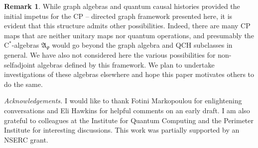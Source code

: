 \documentclass[12pt]{amsart}
\theoremstyle{plain}
\theoremstyle{definition}
\newtheorem{rem}[thm]{Remark}
\newcommand{\ca}{\mathrm{C}^*}
\newcommand{\fA}{{\mathfrak{A}}}
\begin{document}
\begin{rem}
While graph algebras and quantum causal histories provided the
initial impetus for the CP -- directed graph framework presented
here, it is evident that this structure admits other
possibilities. Indeed, there are many CP maps that are neither
unitary maps nor quantum operations, and presumably the
$\ca$-algebras $\fA_\Psi$ would go beyond the graph algebra and
QCH subclasses in general. We have also not considered here the
various possibilities for non-selfadjoint algebras defined by this
framework. We plan to undertake investigations of these algebras
elsewhere and hope this paper motivates others to do the same.
\end{rem}



















\vspace{0.05in}


{\noindent}{\it Acknowledgements.}
I would like to thank Fotini Markopoulou
for enlightening conversations and Eli Hawkins for helpful
comments on an early draft. I am also grateful to colleagues at
the Institute for Quantum Computing and the Perimeter Institute
for interesting discussions. This work was partially supported by
an NSERC grant.
\end{document}

